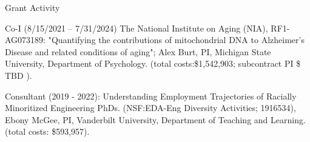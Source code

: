 \begin{rSection}{\textrm{Grant Activity}}%
\begin{etaremune}

\item Co-I (8/15/2021 – 7/31/2024) The National Institute on Aging (NIA), RF1-AG073189: "Quantifying the contributions of mitochondrial DNA to Alzheimer's Disease and related conditions of aging"; Alex Burt, PI, Michigan State University, Department of Psychology.  (total costs:\$1,542,903; subcontract PI \$ TBD ).

\item Consultant (2019 - 2022): Understanding Employment Trajectories of Racially Minoritized Engineering PhDs. (NSF:EDA-Eng Diversity Activities; 1916534),
Ebony McGee, PI, Vanderbilt University, Department of Teaching and Learning.  (total costs: \$593,957).
\end{etaremune}\end{rSection}

